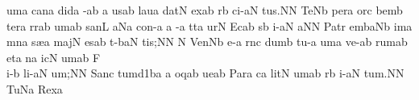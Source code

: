 \sgn {}um\punctum a\egn
\spatium
\sgn can\punctum a\egn
\sgn did\punctum a\egn
\sgn {}{\a}-\pes ab\egn
\custos a\lineaproxima
us\punctum a\augmentum b\egn
\spatium
\divisiominor
\spatium
\sgn lau\punctum a\egn
\sgn dat\punctum N\egn
\spatium
\sgn {}ex\pes ab\egn
\sgn {}{\e}r\punctum b\egn
\sgn ci-\clivis aN\egn
\sgn tu{s.}\punctum N\augmentum N\egn
\spatium
\divisiofinalis
\spatium
\sgn Te{}\pes Nb\egn
\spatium
\sgn per\punctum a\egn
\spatium
\sgn {}or\punctum c\egn
\sgn bem\punctum b\egn
\spatium
\sgn ter\punctum a\egn
\sgn r{\a}r\pes ab\egn
\sgn {}um\punctum a\augmentum b\egn
\spatium
\sgn san\punctum L\egn
{}a{}\pes Na\egn
\spatium
\sgn co{n-}\punctum a\egn
\custos a\lineaproxima
-\punctum a\egn
\sgn t{\e}t\punctum a\egn
\sgn {}ur\punctum N\egn
\spatium
\sgn {}Ec\pes ab\egn
{}s\punctum b\egn
\sgn {}i-\clivis aN\egn
\sgn {}a{}\punctum N\augmentum N\egn
\spatium
\divisiofinalis
\spatium
\sgn Pa{tr}\holyScandicus\egn
\sgn {}em\clivis ba\augmentumduplex Nb\egn
\spatium\divisiominor\spatium
\sgn {}im\punctum a\egn
\sgn m{\e}n\punctum a\egn
\sgn s{\ae}{}\punctum a\egn
\spatium
\sgn maj\punctum N\egn
\sgn {}es\pes ab\egn
\sgn t{\a}-\climacus baN\egn
\sgn ti{s;}\punctum N\augmentum N\egn
\spatium
\divisiofinalis\custos N\lineaproxima
\sgn Ven\pes Nb\egn
\sgn {}e-\punctum a\egn
\sgn r{\a}n\punctum c\egn
\sgn dum\punctum b\egn
\spatium
\sgn tu-\punctum a\egn
\sgn {}um\punctum a\egn
\spatium
\sgn ve-\pes ab\egn
\sgn rum\punctum a\augmentum b\egn
\spatium
\divisiominor
\spatium
\sgn {}et\punctum a\egn
\spatium
\sgn {}{\u}n\punctum a\egn
\sgn {}ic\punctum N\egn
\sgn {}um\pes ab\egn
\spatium
\sgn F{\\i}-\punctum b\egn
\sgn li-\clivis aN\egn
\sgn {}u{m;}\punctum N\augmentum N\egn
\spatium
\divisiofinalis
\spatium
\sgn Sa{nc}\holyScandicus\egn
\sgn tu{m}\episem d1\clivis ba\egn
\spatium\custos a\lineaproxima
oq\pes ab\egn
\sgn ue{}\punctum a\augmentum b\egn
\spatium
\divisiominor
\spatium
\sgn Par\punctum a\egn
\sgn {}{\a}c\punctum a\egn
\sgn lit\punctum N\egn
\sgn {}um\pes ab\egn
\spatium
{}r\punctum b\egn
\sgn {}i-\clivis aN\egn
\sgn tu{m.}\punctum N\augmentum N\egn
\spatium
\divisiofinalis
\spatium
\sgn Tu{}\pes Na\egn
\spatium
\sgn Rex\punctum a\egn
\spatium
